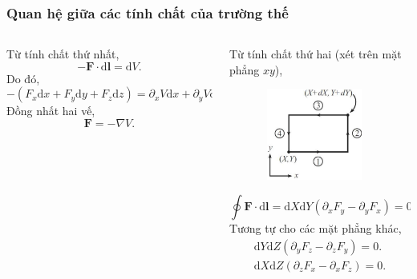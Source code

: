 \begin{frame}
    \frametitle{Quan hệ giữa các tính chất của trường thế}
    \begin{columns}
        \begin{column}{0.5\textwidth}
            \scriptsize
            Từ tính chất thứ nhất,
            \[-\mathbf{F}\cdot\text{d}\mathbf{l}=\text{d}V.\]
            Do đó,
            \[-(F_x \text{d}x +F_y \text{d}y +F_z \text{d}z)=\partial_x V\text{d}x +\partial_y V\text{d}y +\partial_z V\text{d}z.\]
            Đồng nhất hai vế, 
            \[\mathbf{F}=-\nabla V.\]
        \end{column}
        \begin{column}{0.5\textwidth}
            \scriptsize
            Từ tính chất thứ hai (xét trên mặt phẳng \(xy\)),
            \begin{figure}
                \centering
                \includegraphics[width=3.5cm, height=3cm]{Content/Figure/Curl.jpg}
            \end{figure}
            \[\oint \mathbf{F}\cdot \text{d}\mathbf{l}=\text{d}X\text{d}Y\left(\partial_x F_y -\partial_y F_x\right)=0.\]
            Tương tự cho các mặt phẳng khác,
            \vspace{-5pt}
            \begin{align*}
                &\text{d}Y\text{d}Z\left(\partial_y F_z -\partial_z F_y\right)=0.&\\
                &\text{d}X\text{d}Z\left(\partial_z F_x -\partial_x F_z\right)=0.&
            \end{align*}
        \end{column}
    \end{columns}
\end{frame}
